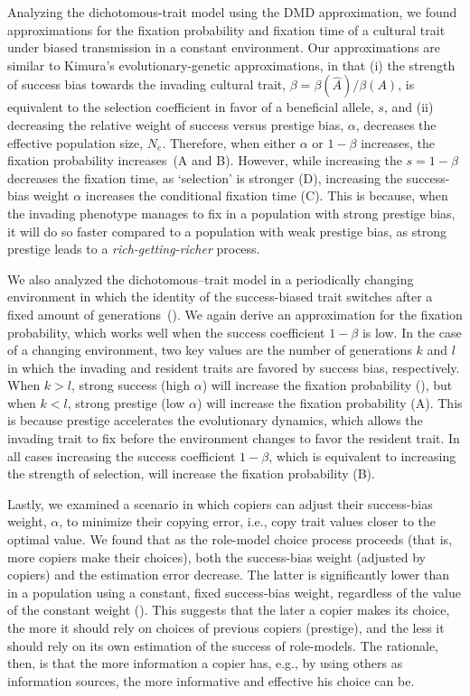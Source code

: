 \documentclass[12pt]{extarticle}
\begin{document}
Analyzing the dichotomous-trait model using the DMD approximation, we found approximations for the fixation probability and fixation time of a cultural trait under biased transmission in a constant environment.
Our approximations are similar to Kimura's evolutionary-genetic approximations, in that (i) the strength of success bias towards the invading cultural trait, $\beta=\beta(\hat{A}) / \beta(A)$, is equivalent to the selection coefficient in favor of a beneficial allele, $s$, and (ii) decreasing the relative weight of success versus prestige bias, $\alpha$, decreases the effective population size, $N_e$. Therefore, when either $\alpha$ or $1-\beta$ increases, the fixation probability increases~(A and B). However, while increasing the $s=1-\beta$ decreases the  fixation time, as `selection' is stronger (D), increasing the success-bias weight $\alpha$ increases the conditional fixation time (C). This is because, when the invading phenotype manages to fix in a population with strong prestige bias, it will do so faster compared to a population with weak prestige bias, as strong prestige leads to a \emph{rich-getting-richer} process.

We also analyzed the dichotomous--trait model in a periodically changing environment in which the identity of the success-biased trait switches after a fixed amount of generations~().
We again derive an approximation for the fixation probability, which works well when the success coefficient $1-\beta$ is low. 
In the case of a changing environment, two key values are the number of generations $k$ and $l$  in which the invading and resident traits are favored by success bias, respectively.
When $k>l$, strong success (high $\alpha$) will increase the fixation probability (),
but when $k<l$, strong prestige (low $\alpha$) will increase the fixation probability (A).
This is because prestige accelerates the evolutionary dynamics, which allows the invading trait to fix before the environment changes to favor the resident trait.
In all cases increasing the success coefficient $1-\beta$, which is equivalent to increasing the strength of selection, will increase the fixation probability (B).


Lastly, we examined a scenario in which copiers can adjust their success-bias weight, $\alpha$, to minimize their copying error, i.e., copy trait values closer to the optimal value.
We found that as the role-model choice process proceeds (that is, more copiers make their choices), both the success-bias weight (adjusted by copiers) and the estimation error decrease. 
The latter is significantly lower than in a population using a constant, fixed success-bias weight, regardless of the value of the constant weight ().
This suggests that the later a copier makes its choice, the more it should rely on choices of previous copiers (prestige), and the less it should rely on its own estimation of the success of role-models.
The rationale, then, is that the more information a copier has, e.g., by using others as information sources, the more informative and effective his choice can be.
\end{document}
